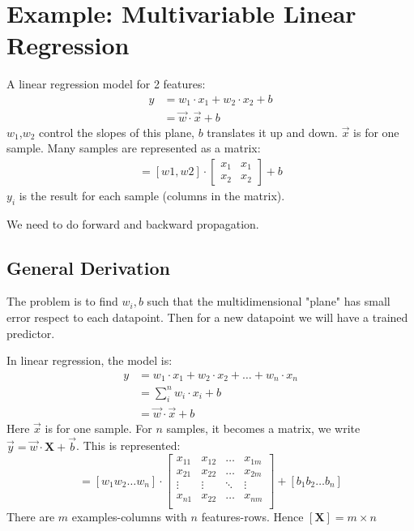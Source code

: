 \documentclass[14pt]{article}
\begin{document}

\section{Example: Multivariable Linear Regression}

A linear regression model for 2 features:
\begin{align*}
 y &= w_1\cdot x_1 + w_2\cdot x_2 + b \\
   &= \vec{w}\cdot\vec{x} + b
\end{align*}
$w_1$,$w_2$ control the slopes of this plane, $b$ translates it up and down. $\vec{x}$ is for one sample. Many samples are represented as a matrix:
\begin{align}
[y1, y2] = 
  [w1, w2]\cdot{}
  \begin{bmatrix}
  x_1 & x_1\\
  x_2 & x_2 
  \end{bmatrix}
 +  b
\end{align}
$y_i$ is the result for each sample (columns in the matrix).

We need to do forward and backward propagation.

\subsection{General Derivation}
The problem is to find $w_i, b$ such that the multidimensional "plane" has small error respect to each datapoint. Then for a new datapoint we will have a trained predictor.

In linear regression, the model is:
\begin{align*}
 y &= w_1\cdot x_1 + w_2\cdot x_2 +\ldots+ w_n\cdot x_n\\
   &= \sum_i^n w_i\cdot x_i + b \\
   &= \vec{w}\cdot\vec{x} + b
\end{align*}
Here $\vec{x}$ is for one sample. For $n$ samples, it becomes a matrix, we write $\vec{y} = \vec{w}\cdot\mathbf{X} + \vec{b}$. This is represented:
\begin{equation}
  [y_1 y_2 \ldots y_n] = 
  [w_1 w_2 \ldots w_n] \cdot
  \begin{bmatrix}
    x_{11} & x_{12} & \ldots & x_{1m}\\
    x_{21} & x_{22} & \ldots & x_{2m}\\
    \vdots & \vdots & \ddots & \vdots\\
    x_{n1} & x_{22} & \ldots & x_{nm}\\
  \end{bmatrix}
  + [b_1 b_2 \ldots b_n]
\end{equation}
There are $m$ examples-columns with $n$ features-rows. Hence $[\mathbf{X}] = m\times{}n$
\end{document}
